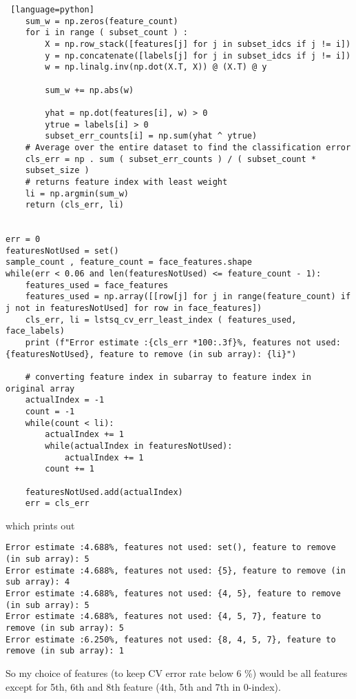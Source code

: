 \documentclass[a4paper, 12pt]{article}
\begin{document}
\begin{solution}
\begin{lstlisting} [language=python]
    sum_w = np.zeros(feature_count)
    for i in range ( subset_count ) :
        X = np.row_stack([features[j] for j in subset_idcs if j != i])
        y = np.concatenate([labels[j] for j in subset_idcs if j != i])
        w = np.linalg.inv(np.dot(X.T, X)) @ (X.T) @ y
        
        sum_w += np.abs(w)
        
        yhat = np.dot(features[i], w) > 0
        ytrue = labels[i] > 0
        subset_err_counts[i] = np.sum(yhat ^ ytrue)
    # Average over the entire dataset to find the classification error
    cls_err = np . sum ( subset_err_counts ) / ( subset_count *
    subset_size )
    # returns feature index with least weight
    li = np.argmin(sum_w)
    return (cls_err, li)


err = 0
featuresNotUsed = set()
sample_count , feature_count = face_features.shape
while(err < 0.06 and len(featuresNotUsed) <= feature_count - 1):
    features_used = face_features
    features_used = np.array([[row[j] for j in range(feature_count) if j not in featuresNotUsed] for row in face_features])
    cls_err, li = lstsq_cv_err_least_index ( features_used, face_labels)
    print (f"Error estimate :{cls_err *100:.3f}%, features not used: {featuresNotUsed}, feature to remove (in sub array): {li}")
    
    # converting feature index in subarray to feature index in original array
    actualIndex = -1
    count = -1
    while(count < li):
        actualIndex += 1
        while(actualIndex in featuresNotUsed):
            actualIndex += 1
        count += 1
        
    featuresNotUsed.add(actualIndex)
    err = cls_err
\end{lstlisting}
which prints out 
\begin{lstlisting}
Error estimate :4.688%, features not used: set(), feature to remove (in sub array): 5
Error estimate :4.688%, features not used: {5}, feature to remove (in sub array): 4
Error estimate :4.688%, features not used: {4, 5}, feature to remove (in sub array): 5
Error estimate :4.688%, features not used: {4, 5, 7}, feature to remove (in sub array): 5
Error estimate :6.250%, features not used: {8, 4, 5, 7}, feature to remove (in sub array): 1
\end{lstlisting}

So my choice of features (to keep CV error rate below 6 \%) would be all features except for 5th, 6th and 8th feature (4th, 5th and 7th in 0-index).
\end{solution}
\end{document}
